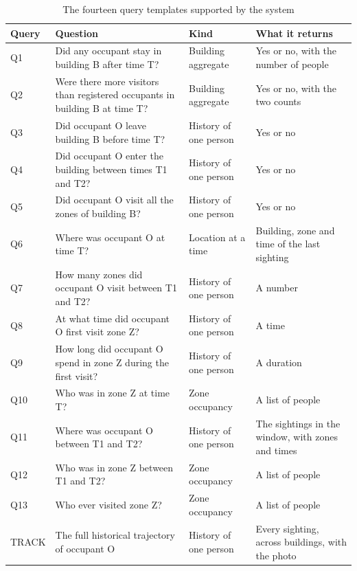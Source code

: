 \documentclass[12pt,a4paper,oneside]{report}
\begin{document}
\begin{table}[htbp]
\centering
\caption{The fourteen query templates supported by the system}\label{tab:queries}
{\footnotesize\setlength{\tabcolsep}{4pt}\renewcommand{\arraystretch}{1.05}
\begin{tabular}{|p{1.3cm}|p{6.2cm}|p{2.6cm}|p{4.1cm}|}\hline
\textbf{Query} & \textbf{Question} & \textbf{Kind} & \textbf{What it returns}\\\hline
Q1 & Did any occupant stay in building B after time T? & Building aggregate & Yes or no, with the number of people\\\hline
Q2 & Were there more visitors than registered occupants in building B at time T? & Building aggregate & Yes or no, with the two counts\\\hline
Q3 & Did occupant O leave building B before time T? & History of one person & Yes or no\\\hline
Q4 & Did occupant O enter the building between times T1 and T2? & History of one person & Yes or no\\\hline
Q5 & Did occupant O visit all the zones of building B? & History of one person & Yes or no\\\hline
Q6 & Where was occupant O at time T? & Location at a time & Building, zone and time of the last sighting\\\hline
Q7 & How many zones did occupant O visit between T1 and T2? & History of one person & A number\\\hline
Q8 & At what time did occupant O first visit zone Z? & History of one person & A time\\\hline
Q9 & How long did occupant O spend in zone Z during the first visit? & History of one person & A duration\\\hline
Q10 & Who was in zone Z at time T? & Zone occupancy & A list of people\\\hline
Q11 & Where was occupant O between T1 and T2? & History of one person & The sightings in the window, with zones and times\\\hline
Q12 & Who was in zone Z between T1 and T2? & Zone occupancy & A list of people\\\hline
Q13 & Who ever visited zone Z? & Zone occupancy & A list of people\\\hline
TRACK & The full historical trajectory of occupant O & History of one person & Every sighting, across buildings, with the photo\\\hline
\end{tabular}}
\end{table}
\end{document}
